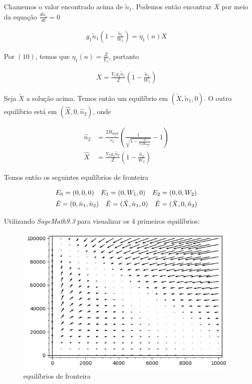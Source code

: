 \documentclass{article}
\begin{document}
Chamemos o valor encontrado acima de $\tilde{n}_1$. Podemos então encontrar $X$ por meio da equação $\frac{d\tilde{n}_1}{dt} = 0$

\begin{align*}
    g_1\tilde{n}_1\left( 1 - \frac{\tilde{n}_1}{W_1} \right) = \eta_1(n)X 
\end{align*}

Por $(10)$, temos que $\eta_1(n) = \frac{Z}{Y_1}$, portanto

\begin{align*}
    X = \frac{Y_1g_1\tilde{n}_1}{Z}\left( 1 - \frac{\tilde{n}_1}{W_1} \right)
\end{align*}

Seja $\tilde{X}$ a solução acima. Temos então um equilíbrio em $(\tilde{X},\tilde{n}_1,0)$. O outro equilíbrio está em $(\hat{X},0,\hat{n}_2)$, onde

\begin{align*}
    \hat{n}_2 &= \frac{2H_{\max_2}}{r_2}\left( \frac{1}{\sqrt{1 - \frac{Z}{Y_2H_{\max_2}}}} - 1 \right) \\
    \hat{X} &= \frac{Y_2g_2\hat{n}_2}{Z}\left( 1 - \frac{\hat{n}_2}{W_2} \right)
\end{align*}

Temos então os seguintes equilíbrios de fronteira

\begin{align*}
    &E_0 = (0,0,0) \quad E_1 = (0,W_1,0) \quad E_2 = (0,0,W_2) \\
    &\Bar{E} = (0,\Bar{n}_1,\Bar{n}_2) \quad \tilde{E} = (\tilde{X},\tilde{n}_1,0) \quad \hat{E} = (\hat{X},0,\hat{n}_2)
\end{align*}

Utilizando \textit{SageMath9.3} para visualizar os 4 primeiros equilíbrios:

\begin{figure}[H]
    \centering
    \includegraphics[width=\textwidth]{x0.png}
    \caption{equilíbrios de fronteira}
    \label{fig:my_label}
\end{figure}
\end{document}
